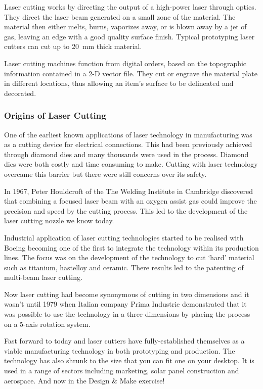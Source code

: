 Laser cutting works by directing the output of a high-power laser through optics. They direct the laser beam generated on a small zone of the material. The material then either melts, burns, vaporizes away, or is blown away by a jet of gas, leaving an edge with a good quality surface finish. Typical prototyping laser cutters can cut up to \SI{20}{\milli\metre} thick material.

Laser cutting machines function from digital orders, based on the topographic information contained in a 2-D vector file. They cut or engrave the material plate in different locations, thus allowing an item's surface to be delineated and decorated.

\subsubsection{Origins of Laser Cutting}

One of the earliest known applications of laser technology in manufacturing was as a cutting device for electrical connections. This had been previously achieved through diamond dies and many thousands were used in the process. Diamond dies were both costly and time consuming to make. Cutting with laser technology overcame this barrier but there were still concerns over its safety.

In 1967, Peter Houldcroft of the The Welding Institute in Cambridge discovered that combining a focused laser beam with an oxygen assist gas could improve the precision and speed by the cutting process. This led to the development of the laser cutting nozzle we know today\cite{sullivan1967}.

Industrial application of laser cutting technologies started to be realised with Boeing becoming one of the first to integrate the technology within its production lines. The focus was on the development of the technology to cut `hard' material such as titanium, hastelloy and ceramic. There results led to the patenting of multi-beam laser cutting.

Now laser cutting had become synonymous of cutting in two dimensions and it wasn't until 1979 when Italian company Prima Industrie demonstrated that it was possible to use the technology in a three-dimensions by placing the process on a 5-axis rotation system.

Fast forward to today and laser cutters have fully-established themselves as a viable manufacturing technology in both prototyping and production. The technology has also shrunk to the size that you can fit one on your desktop. It is used in a range of sectors including marketing, solar panel construction and aerospace. And now in the Design \& Make exercise!


